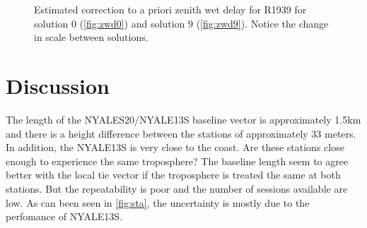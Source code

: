 \documentclass[natbib,twocolumn,twoside]{svmultiag}
\begin{document}
\begin{figure}
	 \\
	 \\
	\caption{Estimated correction to a priori zenith wet delay for R1939 for solution 0 (\ref{fig:zwd0}) and solution
	9 (\ref{fig:zwd9}). Notice the change in scale between solutions.}
	\label{fig:zwd}
\end{figure}


\section{Discussion} 
The length of the NYALES20/NYALE13S baseline 
vector is approximately 1.5km and there is a height difference between the stations of approximately
33 meters. In addition, the NYALE13S is very close to the coast. Are these stations close
enough to experience the same troposphere? The baseline length seem to agree better with the local tie
vector if the troposphere is treated the same at both stations. But the repeatability is poor and
the number of sessions available are low. As can been seen in \ref{fig:sta}, the uncertainty is mostly due to the perfomance of 
NYALE13S. 
\end{document}
